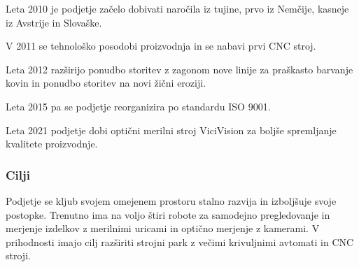 Leta 2010 je podjetje začelo dobivati naročila iz tujine,
prvo iz Nemčije, kasneje iz Avstrije in Slovaške.

V 2011 se tehnološko posodobi proizvodnja
in se nabavi prvi CNC stroj.

Leta 2012 razširijo ponudbo storitev z zagonom nove linije za praškasto barvanje
kovin in ponudbo storitev na novi žični eroziji.

Leta 2015 pa se podjetje reorganizira po standardu ISO 9001.

Leta 2021 podjetje dobi optični merilni stroj ViciVision za boljše spremljanje
kvalitete proizvodnje.

\subsubsection{Cilji}
Podjetje se kljub svojem omejenem prostoru stalno razvija in izboljšuje
svoje postopke. Trenutno ima na voljo štiri robote za samodejno pregledovanje
in merjenje izdelkov z merilnimi uricami in optično merjenje z kamerami.
V prihodnosti imajo cilj razširiti strojni park z večimi krivuljnimi avtomati
in CNC stroji.

\newpage